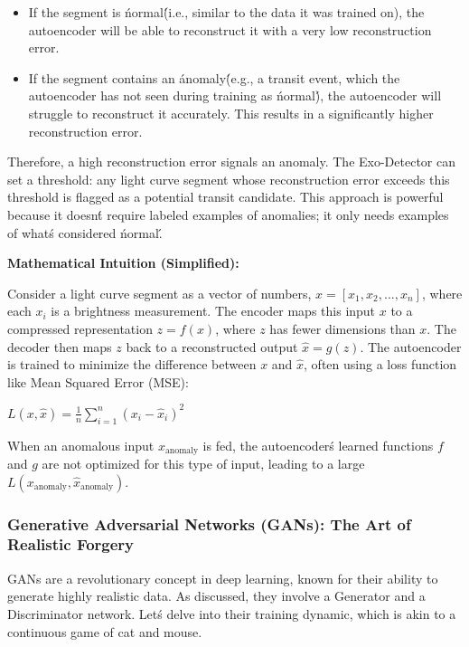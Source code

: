 \documentclass{article}
\begin{document}
\begin{itemize}
    \item If the segment is \'normal\' (i.e., similar to the data it was trained on), the autoencoder will be able to reconstruct it with a very low reconstruction error.
    \item If the segment contains an \'anomaly\' (e.g., a transit event, which the autoencoder has not seen during training as \'normal\'), the autoencoder will struggle to reconstruct it accurately. This results in a significantly higher reconstruction error.
\end{itemize}

Therefore, a high reconstruction error signals an anomaly. The Exo-Detector can set a threshold: any light curve segment whose reconstruction error exceeds this threshold is flagged as a potential transit candidate. This approach is powerful because it doesn\'t require labeled examples of anomalies; it only needs examples of what\'s considered \'normal\'.

\textbf{Mathematical Intuition (Simplified):}

Consider a light curve segment as a vector of numbers, $x = [x_1, x_2, ..., x_n]$, where each $x_i$ is a brightness measurement. The encoder maps this input $x$ to a compressed representation $z = f(x)$, where $z$ has fewer dimensions than $x$. The decoder then maps $z$ back to a reconstructed output $\hat{x} = g(z)$. The autoencoder is trained to minimize the difference between $x$ and $\hat{x}$, often using a loss function like Mean Squared Error (MSE):

$L(x, \hat{x}) = \frac{1}{n} \sum_{i=1}^{n} (x_i - \hat{x}_i)^2$

When an anomalous input $x_{\text{anomaly}}$ is fed, the autoencoder\'s learned functions $f$ and $g$ are not optimized for this type of input, leading to a large $L(x_{\text{anomaly}}, \hat{x}_{\text{anomaly}})$.

\subsubsection{Generative Adversarial Networks (GANs): The Art of Realistic Forgery}

GANs are a revolutionary concept in deep learning, known for their ability to generate highly realistic data. As discussed, they involve a Generator and a Discriminator network. Let\'s delve into their training dynamic, which is akin to a continuous game of cat and mouse.
\end{document}
